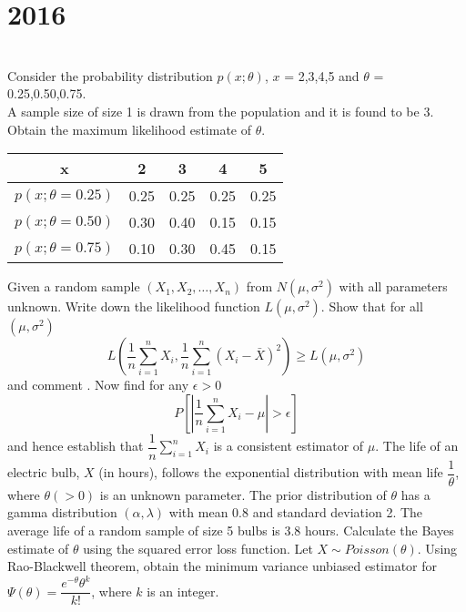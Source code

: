 \section*{2016}
\vspace{-.5cm}
\hrulefill \smallskip\\
Consider the probability distribution $p(x;\theta)$, $x$ = 2,3,4,5 and $\theta$ = 0.25,0.50,0.75. \\ A sample size of size 1 is drawn from the population and it is found to be 3. Obtain the maximum likelihood estimate of $\theta$.
\begin{center}
    \begin{tabular}{|*{5}{c|}}
        \hline
        x & 2 & 3 & 4 & 5  \\\hline
        $p(x; \theta = 0.25)$ & 0.25 & 0.25 & 0.25 & 0.25 \\\hline 
        $p(x; \theta = 0.50)$ & 0.30 & 0.40 & 0.15 & 0.15 \\\hline 
        $p(x; \theta = 0.75)$ & 0.10 & 0.30 & 0.45 & 0.15 \\\hline 
    \end{tabular}
\end{center}
\myline
{} Given a random sample $(X_1,X_2,\ldots,X_n)$ from $N(\mu, \sigma^2)$ with all parameters unknown. Write down the likelihood function $L(\mu, \sigma^2)$. Show that for all $(\mu, \sigma^2)$ 
\[ L\left(\dfrac{1}{n}\sum_{i=1}^{n}X_i, \dfrac{1}{n}\sum_{i=1}^{n}(X_i - \bar{X})^2\right) \geq L(\mu, \sigma^2)\] 
and comment . Now find for any $\epsilon > 0$
\[P \left[ \left| \dfrac{1}{n}\sum_{i=1}^{n}X_i - \mu \right| > \epsilon \right] \] and hence establish that $\dfrac{1}{n}\sum_{i=1}^{n}X_i$ is a consistent estimator of $\mu$.
\myline
{} The life of an electric bulb, $X$ (in hours), follows the exponential distribution with mean life $\dfrac{1}{\theta}$, where $\theta(>0)$ is an unknown parameter. The prior distribution of $\theta$ has a gamma distribution $(\alpha,\lambda)$ with mean 0.8 and standard deviation 2. The average life of a random sample of size 5 bulbs is 3.8 hours. Calculate the Bayes estimate of $\theta$ using the squared error loss function.
\myline
{} Let $X \sim Poisson(\theta)$. Using Rao-Blackwell theorem, obtain the minimum variance unbiased estimator for $\Psi(\theta) = \dfrac{e^{-\theta}\theta^k}{k!}$, where $k$ is an integer.